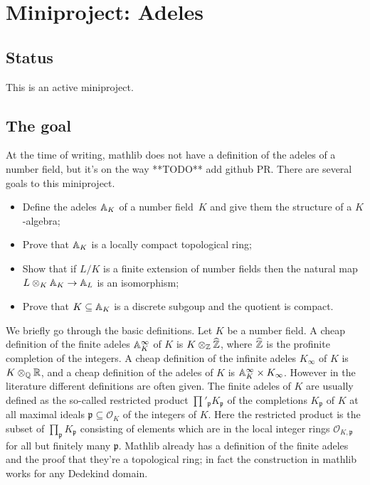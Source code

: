 \chapter{Miniproject: Adeles}\label{Adele_miniproject}

\section{Status}

This is an active miniproject.

\section{The goal}

At the time of writing, mathlib does not have a definition of the adeles of
a number field, but it's on the way **TODO** add github PR.
There are several goals to this miniproject.

\begin{itemize}
  \item Define the adeles $\mathbb{A}_K$ of a number field~$K$ and
  give them the structure of a $K$-algebra;
  \item Prove that $\mathbb{A}_K$ is a locally compact topological ring;
  \item Show that if $L/K$ is a finite extension of number fields then the
    natural map $L\otimes_K\mathbb{A}_K\to\mathbb{A}_L$ is an isomorphism;
  \item Prove that $K \subseteq \mathbb{A}_K$ is a discrete subgoup and the quotient is compact.
\end{itemize}

We briefly go through the basic definitions. Let $K$ be a number field.
A cheap definition of the finite
adeles $\mathbb{A}_K^\infty$ of $K$ is $K\otimes_{\mathbb{Z}}\widehat{\mathbb{Z}}$, where $\widehat{\mathbb{Z}}$ is
the profinite completion of the integers. A cheap definition of the infinite adeles
$K_\infty$ of $K$ is $K\otimes_{\mathbb{Q}}\mathbb{R}$, and a cheap definition of the adeles
of $K$ is $\mathbb{A}_K^\infty\times K_\infty$. However in the literature different definitions
are often given. The finite adeles of $K$ are usually defined
as the so-called restricted product $\prod'_{\mathfrak{p}}K_{\mathfrak{p}}$ of the completions
$K_{\mathfrak{p}}$ of $K$ at all maximal ideals $\mathfrak{p}\subseteq\mathcal{O}_K$ of the
integers of $K$. Here the restricted product is the subset of $\prod_{\mathfrak{p}}K_{\mathfrak{p}}$
consisting of elements which are in the local integer rings $\mathcal{O}_{K,\mathfrak{p}}$ for all
but finitely many $\mathfrak{p}$.
Mathlib already has a definition of the finite adeles and the proof that they're a topological ring;
in fact the construction in mathlib works for any Dedekind domain.

